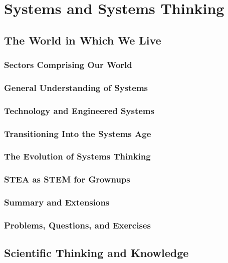 \documentclass[11pt,fleqn]{book} %
\begin{document}
\part{Systems and Systems Thinking}

  \chapter{The World in Which We Live}
  \label{ch:the-world-in}
    \section{Sectors Comprising Our World}
    \section{General Understanding of Systems}
    \section{Technology and Engineered Systems}
    \section{Transitioning Into the Systems Age}
    \section{The Evolution of Systems Thinking}
    \section{STEA as STEM for Grownups}
    \section*{Summary and Extensions}
    \section*{Problems, Questions, and Exercises}
    
  \chapter{Scientific Thinking and Knowledge}
  \label{ch:scientific-thinking-and}
\end{document}
